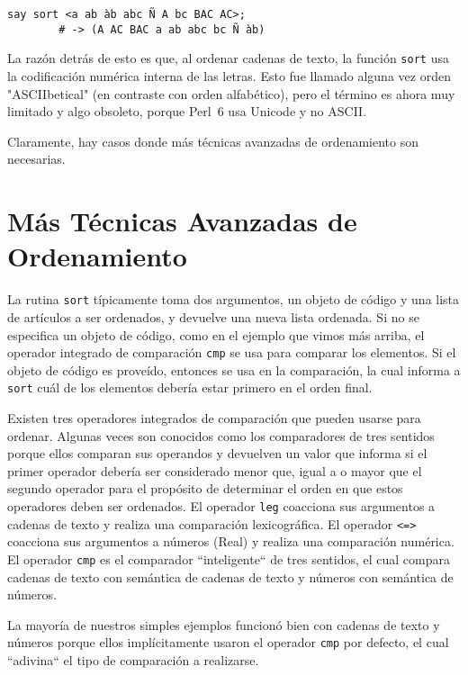 \begin{verbatim}
say sort <a ab àb abc Ñ A bc BAC AC>;
        # -> (A AC BAC a ab abc bc Ñ àb)
\end{verbatim}
%

La razón detrás de esto es que, al ordenar cadenas de texto,
la función {\tt sort} usa la codificación numérica interna
de las letras. Esto fue llamado alguna vez orden 
"ASCIIbetical" (en contraste con orden alfabético),
pero el término es ahora muy limitado y algo obsoleto,
porque Perl~6 usa Unicode y no ASCII.

Claramente, hay casos donde más técnicas avanzadas 
de ordenamiento son necesarias.

\section{Más Técnicas Avanzadas de Ordenamiento}
\label{advanced_sort}

La rutina {\tt sort} típicamente toma dos argumentos,
un objeto de código y una lista de artículos a ser ordenados,
y devuelve una nueva lista ordenada. Si no se especifica un
objeto de código, como en el ejemplo que vimos más arriba,
el operador integrado de comparación {\tt cmp}
se usa para comparar los elementos. Si el objeto de código
es proveído, entonces se usa en la comparación,
la cual informa a {\tt sort} cuál de los elementos
debería estar primero en el orden final.

Existen tres operadores integrados de comparación que pueden
usarse para ordenar. Algunas veces son conocidos como los
comparadores de tres sentidos porque ellos comparan sus operandos
y devuelven un valor que informa si el primer operador debería
ser considerado menor que, igual a o mayor que el segundo operador
para el propósito de determinar el orden en que estos operadores
deben ser ordenados.  El operador {\tt leg} coacciona sus argumentos
a cadenas de texto y realiza una comparación lexicográfica. El operador
\verb|<=>| coacciona sus argumentos a números (Real) y realiza una
comparación numérica. El operador {\tt cmp} es el comparador ``inteligente``
de tres sentidos, el cual compara cadenas de texto con semántica de 
cadenas de texto y números con semántica de números.

La mayoría de nuestros simples ejemplos funcionó bien
con cadenas de texto y números porque ellos implícitamente
usaron el operador {\tt cmp} por defecto, el cual ``adivina``
el tipo de comparación a realizarse.

